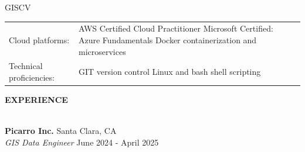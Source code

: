 \documentclass[letterpaper]{article}
\newcommand{\lineunder} {
        \vspace*{-8pt} \\
        \hspace*{-18pt} \hrulefill \\
    }
\newcommand{\header} [1] {
        \vspace{9pt}
        {\hspace*{-18pt}\vspace*{6pt} \large \textbf {#1}}
        \vspace*{-6pt} \lineunder
        \vspace{2pt}
    }
\newcommand{\employer}[4]{
        \vspace{3pt}
        \textbf{#1}  %
        \hfill #2\\  %
        \textit{#3}  %
        \hfill #4\\  %
        \vspace{3mm}
    }
\newenvironment{skillslist}
        {
            \hspace*{-0.07in}\begin{tabular}[t]{ l L{5.17in} }
        }{
            \end{tabular}
        }
\newcommand{\impt}[1]{\uline{#1}}
\begin{document}
\begin{taggedblock}{GISCV}
\begin{skillslist}
            Cloud platforms:&
                AWS Certified Cloud Practitioner \linebreak
                Microsoft Certified: Azure Fundamentals \linebreak
                Docker containerization and microservices \linebreak
                \\
            Technical proficiencies:&
                GIT version control \linebreak
                Linux and bash shell scripting \linebreak
                \\
        \end{skillslist}
    \end{taggedblock}



\header{EXPERIENCE}



    \employer
        {Picarro Inc.}
        {Santa Clara, CA}
        {GIS Data Engineer}
        {June 2024 - April 2025}
\end{document}
